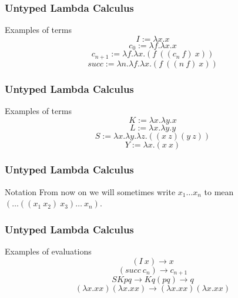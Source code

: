 \documentclass[14pt,compress]{beamer}
\begin{document}

\begin{frame}\label{frame : examples1 of terms}
\frametitle{Untyped Lambda Calculus}

\begin{block}{Examples of terms}
\pause \[ I := \lambda x.x \]
\pause \[ c_0 := \lambda f.\lambda x. x \]
\pause \[ c_{n+1} := \lambda f.\lambda x.(f\ ((c_n\ f)\ x)) \]
\pause \[ succ := \lambda n. \lambda f. \lambda x.(f\ ((n\ f)\ x)) \]
\end{block}
\end{frame}


\begin{frame}\label{frame : examples2 of terms}
\frametitle{Untyped Lambda Calculus}

\begin{block}{Examples of terms}
\pause \[ K := \lambda x.\lambda y. x \]
\pause \[ L := \lambda x.\lambda y. y \]
\pause \[ S := \lambda x. \lambda y. \lambda z.((x\ z)(y\ z))\]
\pause \[ Y := \lambda x.(x\ x) \]
\end{block}
\end{frame}

\begin{frame}\label{frame : notation}
\frametitle{Untyped Lambda Calculus}

\begin{block}{Notation}
From now on we will sometimes write $x_1 \dots x_n$ to mean $(\dots((x_1\ x_2)\ x_3) \dots \ x_n)$.
\end{block} 
\end{frame}

\begin{frame}\label{frame : example of evaluation}
\frametitle{Untyped Lambda Calculus}

\begin{block}{Examples of evaluations}
\pause
\[ (I\ x) \to x \]
\pause
\[ (succ\ c_n) \to c_{n+1} \]
\pause
\[ SKpq \to Kq(pq) \to q\]
\pause
\[ (\lambda x.xx)(\lambda x.xx) \to (\lambda x.xx)(\lambda x.xx) \]
\end{block}

\end{frame}
\end{document}
